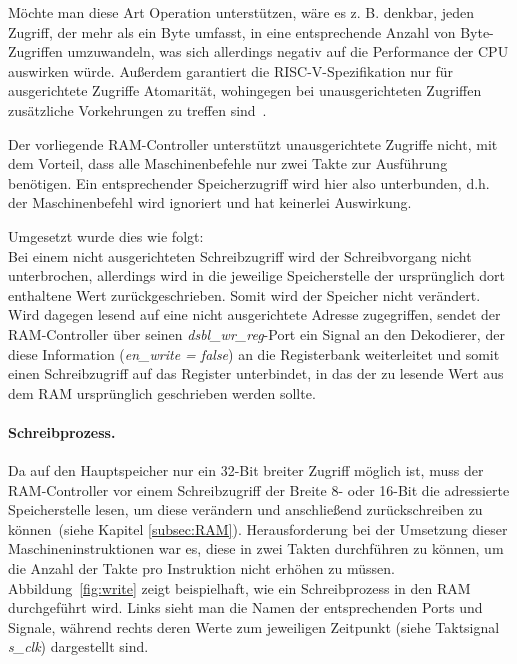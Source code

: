 Möchte man diese Art Operation unterstützen, wäre es z. B. denkbar, jeden Zugriff, der mehr als ein Byte umfasst, in eine entsprechende Anzahl von Byte-Zugriffen umzuwandeln, was sich allerdings negativ auf die Performance der CPU auswirken würde.
Außerdem garantiert die RISC-V-Spezifikation nur für ausgerichtete Zugriffe Atomarität, wohingegen bei unausgerichteten Zugriffen zusätzliche Vorkehrungen zu treffen sind~\cite[S. 18]{RISC}.

Der vorliegende RAM-Controller unterstützt unausgerichtete Zugriffe nicht, mit dem Vorteil, dass alle Maschinenbefehle nur zwei Takte zur Ausführung benötigen.
Ein entsprechender Speicherzugriff wird hier also unterbunden, d.h. der Maschinenbefehl wird ignoriert und hat keinerlei Auswirkung.

Umgesetzt wurde dies wie folgt:\\
Bei einem nicht ausgerichteten Schreibzugriff wird der Schreibvorgang nicht unterbrochen, allerdings wird in die jeweilige Speicherstelle der ursprünglich dort enthaltene Wert zurückgeschrieben.
Somit wird der Speicher nicht verändert.\\
Wird dagegen lesend auf eine nicht ausgerichtete Adresse zugegriffen, sendet der RAM-Controller über seinen \textit{dsbl\_wr\_reg}-Port ein Signal an den Dekodierer, der diese Information (\textit{en\_write = false}) an die Registerbank weiterleitet und somit einen Schreibzugriff auf das Register unterbindet, in das der zu lesende Wert aus dem RAM ursprünglich geschrieben werden sollte.

\paragraph{Schreibprozess.} 
Da auf den Hauptspeicher nur ein 32-Bit breiter Zugriff möglich ist, muss der RAM-Controller vor einem Schreibzugriff der Breite 8- oder 16-Bit die adressierte Speicherstelle lesen, um diese verändern und anschließend zurückschreiben zu können~(siehe Kapitel \ref{subsec:RAM}).
Herausforderung bei der Umsetzung dieser Maschineninstruktionen war es, diese in zwei Takten durchführen zu können, um die Anzahl der Takte pro Instruktion nicht erhöhen zu müssen.
Abbildung~\ref{fig:write} zeigt beispielhaft, wie ein Schreibprozess in den RAM durchgeführt wird.
Links sieht man die Namen der entsprechenden Ports und Signale, während rechts deren Werte zum jeweiligen Zeitpunkt (siehe Taktsignal \textit{s\_clk}) dargestellt sind.

